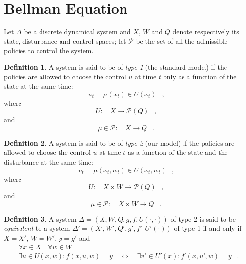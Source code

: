 \documentclass[11pt,a4paper]{article}
\DeclareMathOperator{\mf}{\enspace .}
\DeclareMathOperator{\mc}{\enspace ,}
\newcommand{\tone}{}
\newcommand{\ttwo}{'}
\theoremstyle{definition}
\newtheorem{definition}{Definition}
\theoremstyle{remark}
\begin{document}
\section{Bellman Equation}
\label{sec:bellman-equation}
Let $\Delta$ be a discrete dynamical system and $X$, $W$ and $Q$ denote
respectively its state, disturbance and control spaces; let $\mathcal{P}$ be the
set of all the admissible policies to control the system.
\begin{definition}
  A system is said to be of \emph{type 1} (the standard model) if the policies
  are allowed to choose the control $u$ at time $t$ only as a function of the
  state at the same time:
  \begin{equation}
    u_t=\mu\left(x_t\right) \in U\left(x_t\right) \mc
  \end{equation}
  where
  \begin{equation}
    U:\quad X \rightarrow \mathscr{P}(Q) \mc
  \end{equation}
  and
  \begin{equation}
    \mu\in \mathcal{P}:\quad X \rightarrow Q \mf
  \end{equation}
\end{definition}
\begin{definition}
  A system is said to be of \emph{type 2} (our model) if the policies are
  allowed to choose the control $u$ at time $t$ as a function of the state and
  the disturbance at the same time:
  \begin{equation}
    u_t=\mu\left(x_t,w_t\right) \in U\left(x_t,w_t\right) \mc
  \end{equation}
  where
  \begin{equation}
    U:\quad X\times W \rightarrow \mathscr{P}(Q) \mc
  \end{equation}
  and
  \begin{equation}
    \mu\in \mathcal{P}:\quad X\times W \rightarrow Q \mf
  \end{equation}
\end{definition}
\begin{definition}
  A system
  $\Delta\tone=\left(X\tone,W\tone,Q\tone,g\tone,f\tone,U\tone(\cdot,\cdot)\right)$
  of type 2 is said to be \emph{equivalent} to a system
  $\Delta\ttwo=\left(X\ttwo,W\ttwo,Q\ttwo,g\ttwo,f\ttwo,U\ttwo(\cdot)\right)$ of
  type 1 if and only if $X\tone=X\ttwo$, $W\tone=W\ttwo$, $g\tone=g\ttwo$ and
  \begin{equation}
    \begin{split}
      &\forall x \in X \quad \forall w \in W\\
      &\exists u\tone \in U\tone(x,w) : f\tone(x,u\tone,w)=y \quad \Longleftrightarrow \quad
      \exists u\ttwo \in U\ttwo(x) : f\ttwo(x,u\ttwo,w)=y  \mf
    \end{split}
  \end{equation}
\end{definition}
\end{document}
